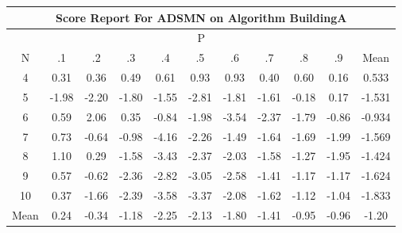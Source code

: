 \documentclass[11pt,a4paper]{report}
\begin{document}
\begin{longtable}{ | c || c | c | c | c | c | c | c | c | c || c |}
\hline
\multicolumn{11}{|c|}{ Score Report For ADSMN on Algorithm BuildingA} \\
\hline
\multicolumn{11}{|c|}{ P } \\
\hline
N & .1 & .2 & .3 & .4 & .5 & .6 & .7 & .8 & .9 & Mean\\
 \hline
 \hline
 \endhead
  4 &  \cellcolor[HTML]{F7F7FF} 0.31 &  \cellcolor[HTML]{F7F7FF} 0.36 &  \cellcolor[HTML]{EFEFFF} 0.49 &  \cellcolor[HTML]{EFEFFF} 0.61 &  \cellcolor[HTML]{E7E7FF} 0.93 &  \cellcolor[HTML]{E7E7FF} 0.93 &  \cellcolor[HTML]{F7F7FF} 0.40 &  \cellcolor[HTML]{EFEFFF} 0.60 &  \cellcolor[HTML]{FFFFFF} 0.16 & 0.533 \\
  5 &  \cellcolor[HTML]{FFCFCF} -1.98 &  \cellcolor[HTML]{FFC7C7} -2.20 &  \cellcolor[HTML]{FFCFCF} -1.80 &  \cellcolor[HTML]{FFD7D7} -1.55 &  \cellcolor[HTML]{FFB7B7} -2.81 &  \cellcolor[HTML]{FFCFCF} -1.81 &  \cellcolor[HTML]{FFD7D7} -1.61 &  \cellcolor[HTML]{FFF7F7} -0.18 &  \cellcolor[HTML]{F7F7FF} 0.17 & -1.531 \\
  6 &  \cellcolor[HTML]{EFEFFF} 0.59 &  \cellcolor[HTML]{CFCFFF} 2.06 &  \cellcolor[HTML]{F7F7FF} 0.35 &  \cellcolor[HTML]{FFE7E7} -0.84 &  \cellcolor[HTML]{FFCFCF} -1.98 &  \cellcolor[HTML]{FFA7A7} -3.54 &  \cellcolor[HTML]{FFC7C7} -2.37 &  \cellcolor[HTML]{FFCFCF} -1.79 &  \cellcolor[HTML]{FFE7E7} -0.86 & -0.934 \\
  7 &  \cellcolor[HTML]{EFEFFF} 0.73 &  \cellcolor[HTML]{FFEFEF} -0.64 &  \cellcolor[HTML]{FFE7E7} -0.98 &  \cellcolor[HTML]{FF9797} -4.16 &  \cellcolor[HTML]{FFC7C7} -2.26 &  \cellcolor[HTML]{FFD7D7} -1.49 &  \cellcolor[HTML]{FFD7D7} -1.64 &  \cellcolor[HTML]{FFD7D7} -1.69 &  \cellcolor[HTML]{FFCFCF} -1.99 & -1.569 \\
  8 &  \cellcolor[HTML]{E7E7FF} 1.10 &  \cellcolor[HTML]{F7F7FF} 0.29 &  \cellcolor[HTML]{FFD7D7} -1.58 &  \cellcolor[HTML]{FFA7A7} -3.43 &  \cellcolor[HTML]{FFC7C7} -2.37 &  \cellcolor[HTML]{FFCFCF} -2.03 &  \cellcolor[HTML]{FFD7D7} -1.58 &  \cellcolor[HTML]{FFDFDF} -1.27 &  \cellcolor[HTML]{FFCFCF} -1.95 & -1.424 \\
  9 &  \cellcolor[HTML]{EFEFFF} 0.57 &  \cellcolor[HTML]{FFEFEF} -0.62 &  \cellcolor[HTML]{FFC7C7} -2.36 &  \cellcolor[HTML]{FFB7B7} -2.82 &  \cellcolor[HTML]{FFAFAF} -3.05 &  \cellcolor[HTML]{FFBFBF} -2.58 &  \cellcolor[HTML]{FFDFDF} -1.41 &  \cellcolor[HTML]{FFDFDF} -1.17 &  \cellcolor[HTML]{FFDFDF} -1.17 & -1.624 \\
  10 &  \cellcolor[HTML]{F7F7FF} 0.37 &  \cellcolor[HTML]{FFD7D7} -1.66 &  \cellcolor[HTML]{FFBFBF} -2.39 &  \cellcolor[HTML]{FFA7A7} -3.58 &  \cellcolor[HTML]{FFA7A7} -3.37 &  \cellcolor[HTML]{FFC7C7} -2.08 &  \cellcolor[HTML]{FFD7D7} -1.62 &  \cellcolor[HTML]{FFDFDF} -1.12 &  \cellcolor[HTML]{FFE7E7} -1.04 & -1.833 \\
 \hline
 \hline
Mean &  \cellcolor[HTML]{F7F7FF} 0.24 &  \cellcolor[HTML]{FFF7F7} -0.34 &  \cellcolor[HTML]{FFDFDF} -1.18 &  \cellcolor[HTML]{FFC7C7} -2.25 &  \cellcolor[HTML]{FFC7C7} -2.13 &  \cellcolor[HTML]{FFCFCF} -1.80 &  \cellcolor[HTML]{FFDFDF} -1.41 &  \cellcolor[HTML]{FFE7E7} -0.95 &  \cellcolor[HTML]{FFE7E7} -0.96 &  \cellcolor[HTML]{FFDFDF} -1.20
\end{longtable}
\end{document}
